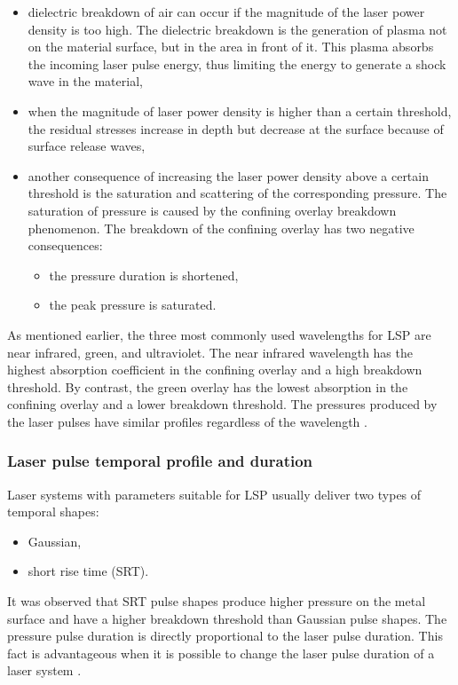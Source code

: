\begin{itemize}

    \item dielectric breakdown of air can occur if the magnitude of the laser power density is too high. The dielectric breakdown is the generation of plasma not on the material surface, but in the area in front of it. This plasma absorbs the incoming laser pulse energy, thus limiting the energy to generate a shock wave in the material,

    \item when the magnitude of laser power density is higher than a certain threshold, the residual stresses increase in depth but decrease at the surface because of surface release waves,

    \item another consequence of increasing the laser power density above a certain threshold is the saturation and scattering of the corresponding pressure. The saturation of pressure is caused by the confining overlay breakdown phenomenon. The breakdown of the confining overlay has two negative consequences: 
    
    \begin{itemize}
        \item the pressure duration is shortened,
        \item the peak pressure is saturated.
    \end{itemize}
  
  
\end{itemize}    

As mentioned earlier, the three most commonly used wavelengths for LSP are near infrared, green, and ultraviolet. The near infrared wavelength has the highest absorption coefficient in the confining overlay and a high breakdown threshold. By contrast, the green overlay has the lowest absorption in the confining overlay and a lower breakdown threshold. The pressures produced by the laser pulses have similar profiles regardless of the wavelength \cite{berthe_fabbro_peyre_bartnicki_1999}.



\subsubsection*{Laser pulse temporal profile and duration}

Laser systems with parameters suitable for LSP usually deliver two types of temporal shapes:

\begin{itemize}

    \item Gaussian,
    \item short rise time (SRT).
    
\end{itemize}
It was observed that SRT pulse shapes produce higher pressure on the metal surface and have a higher breakdown threshold than Gaussian pulse shapes. The pressure pulse duration is directly proportional to the laser pulse duration.  This fact is advantageous when it is possible to change the laser pulse duration of a laser system \cite{devaux_fabbro_tollier_bartnicki_1993}. 


